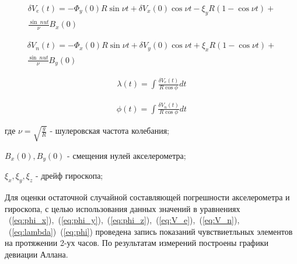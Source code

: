 \begin{equation}
	\label{eq:V_e}
	\begin{gathered}
		\delta V_e(t) = - \varPhi_y(0) R \sin \nu t + \delta V_x(0) \cos \nu t - \xi_y R (1 - \cos \nu t) + \\
		\frac{\sin \ nu t}{ \nu } B_x(0)
	\end{gathered}
\end{equation}


\begin{equation}
	\label{eq:V_n}
	\begin{gathered}
		\delta V_n(t) = - \varPhi_x(0) R \sin \nu t + \delta V_y(0) \cos \nu t + \xi_x R (1 - \cos \nu t) + \\
		\frac{\sin \ nu t}{ \nu } B_y(0)
	\end{gathered}
\end{equation}

\begin{equation}
	\label{eq:lambda}
	\begin{gathered}
		\lambda (t) = \int \frac{\delta V_e(t)}{R \cos \phi} dt
	\end{gathered}
\end{equation}

\begin{equation}
	\label{eq:phi}
	\begin{gathered}
		\phi (t) = \int \frac{\delta V_n(t)}{R \cos \phi} dt
	\end{gathered}
\end{equation}



\vspace{0.5cm}
где { \large $ \nu = \sqrt{ \frac{g}{R} } $ } - шулеровская частота колебания;


\vspace{0.5cm}
{\large $ B_x(0), B_y(0) $} - смещения нулей акселерометра;


\vspace{0.5cm}
{\large $ \xi_x, \xi_y, \xi_z $} - дрейф гироскопа;


\vspace{0.5cm}
Для оценки остаточной случайной составляющей погрешности акселерометра и гироскопа, с целью использования
данных значений в уравнениях  ~(\ref{eq:phi_x}),~(\ref{eq:phi_y}),~(\ref{eq:phi_z}),~(\ref{eq:V_e}),~(\ref{eq:V_n}), ~(\ref{eq:lambda})~(\ref{eq:phi}) проведена запись показаний чувствиетльных элементов на протяжении 2-ух часов. По результатам измерений построены графики девиации Аллана. 


